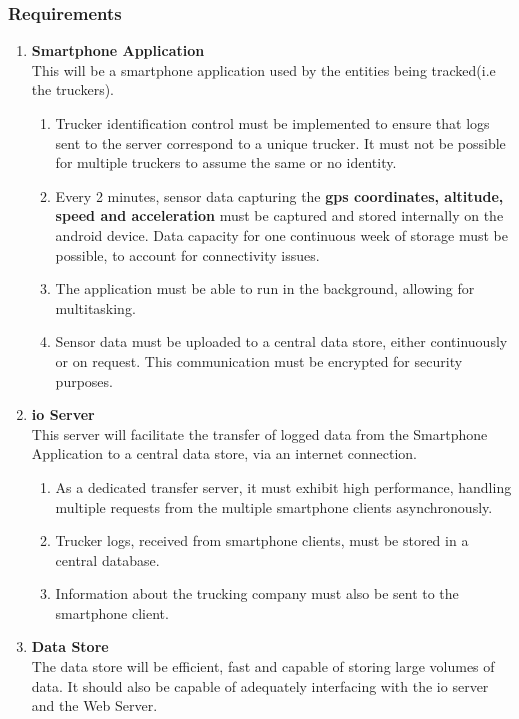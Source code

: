 \subsubsection{Requirements}
\begin{enumerate}
\item \textbf{Smartphone Application}\\
    This will be a smartphone application used by the entities being tracked(i.e the truckers).
    \begin{enumerate}
        \item Trucker identification control must be implemented to ensure that logs sent to the server correspond to a unique trucker. It must not be possible for multiple truckers to assume the same or no identity.
        \item Every 2 minutes, sensor data capturing the \textbf{\ac{gps} coordinates, altitude, speed and acceleration} must be captured and stored internally on the android device. 
        Data capacity for one continuous week of storage must be possible, to account for connectivity issues.
        \item The application must be able to run in the background, allowing for multitasking.
        \item Sensor data must be uploaded to a central data store, either continuously or on request. This communication must be encrypted for security purposes.
    \end{enumerate}
\item \textbf{\ac{io} Server}\\
This server will facilitate the transfer of logged data from the Smartphone Application to a central data store, via an internet connection. 
    \begin{enumerate}
        \item As a dedicated transfer server, it must exhibit high performance, handling multiple requests from the multiple smartphone clients asynchronously.
        \item Trucker logs, received from smartphone clients, must be stored in a central database.
        \item Information about the trucking company must also be sent to the smartphone client.
    \end{enumerate}
\item \textbf{Data Store}\\
The data store will be efficient, fast and capable of storing large volumes of data.
It should also be capable of adequately interfacing with the \ac{io} server and the Web Server.

\end{enumerate}
